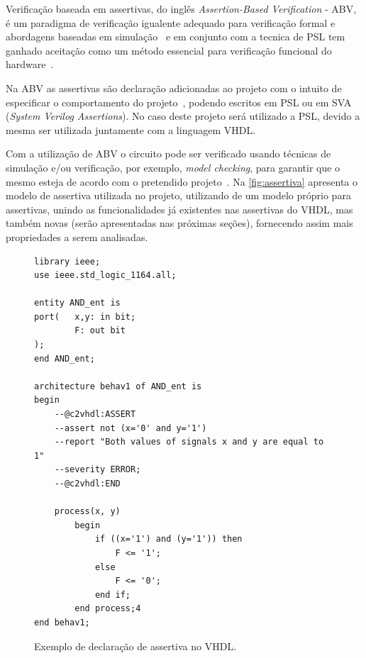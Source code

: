 Verificação baseada em assertivas, do inglês \textit{Assertion-Based Verification} - ABV, é um paradigma de verificação igualente adequado para verificação formal e abordagens baseadas em simulação~\cite{boule2005incorporating} e em conjunto com a tecnica de PSL tem ganhado aceitação como um método essencial para verificação funcional do hardware~\cite{DahanCombining}.

\par
Na ABV as assertivas são declaração adicionadas ao projeto com o intuito de especificar o comportamento do projeto~\cite{boule2005incorporating}, podendo escritos em PSL ou em SVA (\textit{System Verilog Assertions}). No caso deste projeto será utilizado a PSL, devido a mesma ser utilizada juntamente com a linguagem VHDL.

\par
Com a utilização de ABV o circuito pode ser verificado usando técnicas de simulação e/ou verificação, por exemplo, \textit{model checking}, para garantir que o mesmo esteja de acordo com o pretendido projeto~\cite{DahanCombining}. 
% 
Na \autoref{fig:assertiva} apresenta o modelo de assertiva utilizada no projeto, utilizando de um modelo próprio para assertivas, unindo as funcionalidades já existentes nas assertivas do VHDL, mas também novas (serão apresentadas nas próximas seções), fornecendo assim mais propriedades a serem analisadas.


\begin{figure}[thp]
\caption{\label{fig:assertiva} Exemplo de declaração de assertiva no VHDL.}
	\begin{center}
    \begin{minipage}{0.9\textwidth}
    \begin{lstlisting}       
library ieee;
use ieee.std_logic_1164.all;

entity AND_ent is
port(   x,y: in bit;
        F: out bit
);
end AND_ent;

architecture behav1 of AND_ent is
begin
	--@c2vhdl:ASSERT
    --assert not (x='0' and y='1')
    --report "Both values of signals x and y are equal to 1"
    --severity ERROR;
    --@c2vhdl:END

	process(x, y)
    	begin
        	if ((x='1') and (y='1')) then
            	F <= '1';
        	else
            	F <= '0';
        	end if;
    	end process;4
end behav1;

\end{lstlisting}
    \end{minipage}
	\end{center}
\end{figure}



